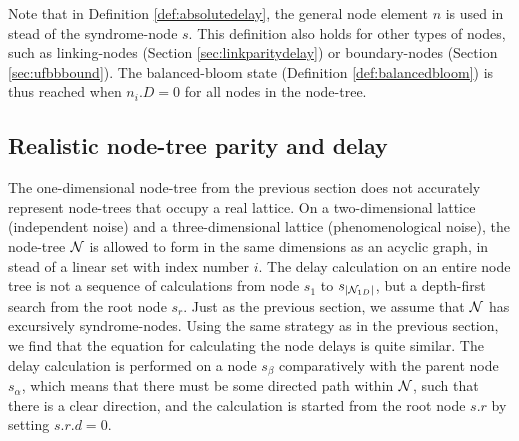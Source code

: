 Note that in Definition \ref{def:absolutedelay}, the general node element $n$ is used in stead of the syndrome-node $s$. This definition also holds for other types of nodes, such as linking-nodes (Section \ref{sec:linkparitydelay}) or boundary-nodes (Section \ref{sec:ufbbbound}). The balanced-bloom state (Definition \ref{def:balancedbloom}) is thus reached when $n_i.D = 0$ for all nodes in the node-tree. 

\subsection{Realistic node-tree parity and delay}\label{sec:realisticnodetree}

The one-dimensional node-tree from the previous section does not accurately represent node-trees that occupy a real lattice. On a two-dimensional lattice (independent noise) and a three-dimensional lattice (phenomenological noise), the node-tree $\mathcal{N}$ is allowed to form in the same dimensions as an acyclic graph, in stead of a linear set with index number $i$. The delay calculation on an entire node tree is not a sequence of calculations from node $s_1$ to $s_{|\mathcal{N}_{1D}|}$, but a depth-first search from the root node $s_r$. Just as the previous section, we assume that $\mathcal{N}$ has excursively syndrome-nodes. Using the same strategy as in the previous section, we find that the equation for calculating the node delays is quite similar. The delay calculation is performed on a node $s_\beta$ comparatively with the parent node $s_\alpha$, which means that there must be some directed path within $\mathcal{N}$, such that there is a clear direction, and the calculation is started from the root node $s.r$ by setting $s.r.d=0$.

